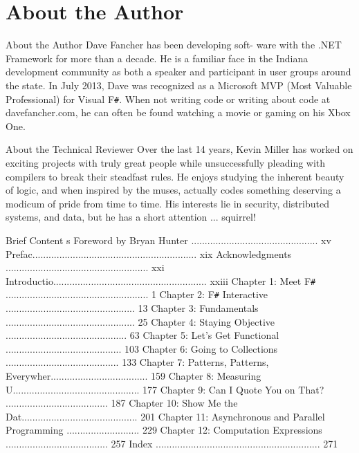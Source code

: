 \documentclass{book}
\begin{document}
\chapter{About the Author}
About the Author
Dave Fancher has been developing soft-
ware with the .NET Framework for more
than a decade. He is a familiar face in
the Indiana development community as
both a speaker and participant in user
groups around the state. In July 2013,
Dave was recognized as a Microsoft MVP
(Most Valuable Professional) for Visual F\verb|#|.
When not writing code or writing about
code at davefancher.com, he can often be
found watching a movie or gaming on his
Xbox One.

About the Technical Reviewer
Over the last 14 years, Kevin Miller has
worked on exciting projects with truly great
people while unsuccessfully pleading with
compilers to break their steadfast rules. He
enjoys studying the inherent beauty of logic,
and when inspired by the muses, actually
codes something deserving a modicum of
pride from time to time. His interests lie in
security, distributed systems, and data, but
he has a short attention ... squirrel!


Brief Content s
Foreword by Bryan Hunter ............................................... xv
Prefac............................................................. xix
Acknowledgments ..................................................... xxi
Introductio......................................................... xxiii
Chapter 1: Meet F\verb|#| ..................................................... 1
Chapter 2: F\verb|#| Interactive ................................................ 13
Chapter 3: Fundamentals ................................................ 25
Chapter 4: Staying Objective ............................................. 63
Chapter 5: Let’s Get Functional ........................................... 103
Chapter 6: Going to Collections .......................................... 133
Chapter 7: Patterns, Patterns, Everywher.................................... 159
Chapter 8: Measuring U............................................... 177
Chapter 9: Can I Quote You on That? ...................................... 187
Chapter 10: Show Me the Dat........................................... 201
Chapter 11: Asynchronous and Parallel Programming ........................... 229
Chapter 12: Computation Expressions ...................................... 257
Index ............................................................. 271
\end{document}
